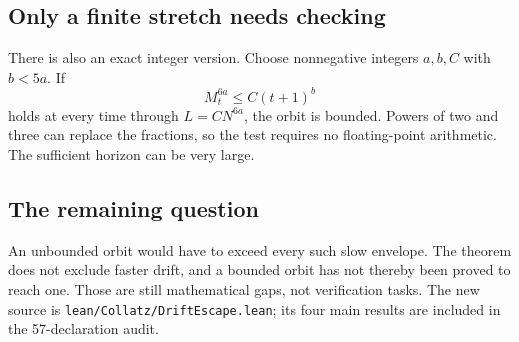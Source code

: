 \documentclass[11pt]{article}
\begin{document}
\subsection*{Only a finite stretch needs checking}
There is also an exact integer version. Choose nonnegative integers $a,b,C$ with $b<5a$. If
\[
M_t^{6a}\le C(t+1)^b
\]
holds at every time through $L=C N^{6a}$, the orbit is bounded. Powers of two and three can replace the fractions, so the test requires no floating-point arithmetic. The sufficient horizon can be very large.

\subsection*{The remaining question}
An unbounded orbit would have to exceed every such slow envelope. The theorem does not exclude faster drift, and a bounded orbit has not thereby been proved to reach one. Those are still mathematical gaps, not verification tasks. The new source is \texttt{lean/Collatz/DriftEscape.lean}; its four main results are included in the 57-declaration audit.
\end{document}
